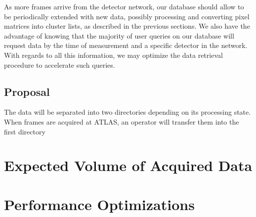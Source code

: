 
As more frames arrive from the detector network, our database should allow to be periodically extended with new data, possibly processing and converting pixel matrices into cluster lists, as described in the previous sections. We also have the advantage of knowing that the majority of user queries on our database will request data by the time of measurement and a specific detector in the network. With regards to all this information, we may optimize the data retrieval procedure to accelerate such queries.


\subsection{Proposal}
The data will be separated into two directories depending on its processing state. When frames are acquired at ATLAS, an operator will transfer them into the first directory


\section{Expected Volume of Acquired Data}

\section{Performance Optimizations}

